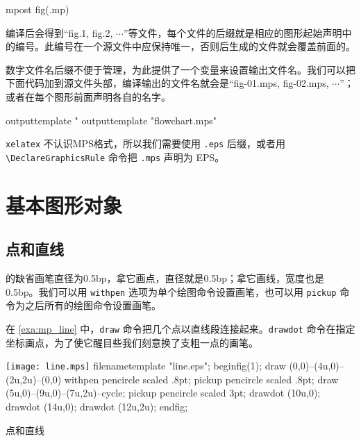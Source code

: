 \begin{Code}[]
mpost fig(.mp)
\end{Code}

编译后会得到“fig.1, fig.2, $\cdots$”等文件，每个文件的后缀就是相应的图形起始声明中的编号。此编号在一个源文件中应保持唯一，否则后生成的文件就会覆盖前面的。

数字文件名后缀不便于管理，\MP 为此提供了一个变量来设置输出文件名。我们可以把下面代码加到源文件头部，编译输出的文件名就会是“fig-01.mps, fig-02.mps, $\cdots$”；或者在每个图形前面声明各自的名字。

\begin{Code}[]
outputtemplate "%
outputtemplate "flowchart.mps" %
\end{Code}

\texttt{xelatex} 不认识MPS格式，所以我们需要使用 \texttt{.eps} 后缀，或者用 \verb|\DeclareGraphicsRule| 命令把 \texttt{.mps} 声明为 EPS。

\begin{Code}[]
\end{Code}

\section{基本图形对象}

\subsection{点和直线}

\MP 的缺省画笔直径为0.5bp，拿它画点，直径就是0.5bp；拿它画线，宽度也是0.5bp。我们可以用 \texttt{withpen} 选项为单个绘图命令设置画笔，也可以用 \texttt{pickup} 命令为之后所有的绘图命令设置画笔。

在 \autoref{exa:mp_line} 中，\texttt{draw} 命令把几个点以直线段连接起来。\texttt{drawdot} 命令在指定坐标画点，为了使它醒目些我们刻意换了支粗一点的画笔。

\begin{example}[htbp]
\begin{FBTDemo}[numbers=left]{\texttt{[image: line.mps]}}
filenametemplate "line.eps";
beginfig(1);
draw (0,0)--(4u,0)--(2u,2u)--(0,0) 
  withpen pencircle scaled .8pt;
pickup pencircle scaled .8pt;
draw (5u,0)--(9u,0)--(7u,2u)--cycle;
pickup pencircle scaled 3pt;
drawdot (10u,0);
drawdot (14u,0);
drawdot (12u,2u);
endfig;
\end{FBTDemo}
\caption{\MP 点和直线}
\label{exa:mp_line}
\end{example}

